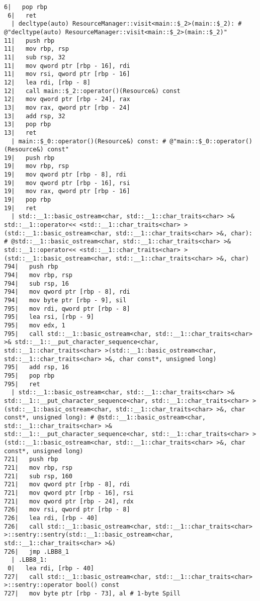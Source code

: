 \begin{lstlisting}[language={},numbers=none,title=\href{https://godbolt.org/z/hwKje8}{\texttt{godbolt.org/z/hwKje8}}]
 6|   pop rbp
 6|   ret
  | decltype(auto) ResourceManager::visit<main::$_2>(main::$_2): # @"decltype(auto) ResourceManager::visit<main::$_2>(main::$_2)"
11|   push rbp
11|   mov rbp, rsp
11|   sub rsp, 32
11|   mov qword ptr [rbp - 16], rdi
11|   mov rsi, qword ptr [rbp - 16]
12|   lea rdi, [rbp - 8]
12|   call main::$_2::operator()(Resource&) const
12|   mov qword ptr [rbp - 24], rax
13|   mov rax, qword ptr [rbp - 24]
13|   add rsp, 32
13|   pop rbp
13|   ret
  | main::$_0::operator()(Resource&) const: # @"main::$_0::operator()(Resource&) const"
19|   push rbp
19|   mov rbp, rsp
19|   mov qword ptr [rbp - 8], rdi
19|   mov qword ptr [rbp - 16], rsi
19|   mov rax, qword ptr [rbp - 16]
19|   pop rbp
19|   ret
  | std::__1::basic_ostream<char, std::__1::char_traits<char> >& std::__1::operator<< <std::__1::char_traits<char> >(std::__1::basic_ostream<char, std::__1::char_traits<char> >&, char): # @std::__1::basic_ostream<char, std::__1::char_traits<char> >& std::__1::operator<< <std::__1::char_traits<char> >(std::__1::basic_ostream<char, std::__1::char_traits<char> >&, char)
794|   push rbp
794|   mov rbp, rsp
794|   sub rsp, 16
794|   mov qword ptr [rbp - 8], rdi
794|   mov byte ptr [rbp - 9], sil
795|   mov rdi, qword ptr [rbp - 8]
795|   lea rsi, [rbp - 9]
795|   mov edx, 1
795|   call std::__1::basic_ostream<char, std::__1::char_traits<char> >& std::__1::__put_character_sequence<char, std::__1::char_traits<char> >(std::__1::basic_ostream<char, std::__1::char_traits<char> >&, char const*, unsigned long)
795|   add rsp, 16
795|   pop rbp
795|   ret
  | std::__1::basic_ostream<char, std::__1::char_traits<char> >& std::__1::__put_character_sequence<char, std::__1::char_traits<char> >(std::__1::basic_ostream<char, std::__1::char_traits<char> >&, char const*, unsigned long): # @std::__1::basic_ostream<char, std::__1::char_traits<char> >& std::__1::__put_character_sequence<char, std::__1::char_traits<char> >(std::__1::basic_ostream<char, std::__1::char_traits<char> >&, char const*, unsigned long)
721|   push rbp
721|   mov rbp, rsp
721|   sub rsp, 160
721|   mov qword ptr [rbp - 8], rdi
721|   mov qword ptr [rbp - 16], rsi
721|   mov qword ptr [rbp - 24], rdx
726|   mov rsi, qword ptr [rbp - 8]
726|   lea rdi, [rbp - 40]
726|   call std::__1::basic_ostream<char, std::__1::char_traits<char> >::sentry::sentry(std::__1::basic_ostream<char, std::__1::char_traits<char> >&)
726|   jmp .LBB8_1
  | .LBB8_1:
 0|   lea rdi, [rbp - 40]
727|   call std::__1::basic_ostream<char, std::__1::char_traits<char> >::sentry::operator bool() const
727|   mov byte ptr [rbp - 73], al # 1-byte Spill

\end{lstlisting}

